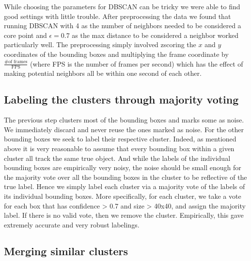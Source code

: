 \documentclass{article}
\begin{document}
While choosing the parameters for DBSCAN can be tricky we were able to find good settings with little trouble.
After preprocessing the data we found that running DBSCAN with 4 as the number of neighbors needed to be considered a core point and $\epsilon=0.7$ as
the max distance to be considered a neighbor worked particularly well. The preprocessing simply involved zscoring the $x$ and $y$ coordinates of the bounding boxes
and multiplying the frame coordinate by $\frac{\text{\# of frames}}{\text{FPS}}$ (where FPS is the number of frames per second) which has the effect of making potential neighbors all be within one
second of each other.

\subsection{Labeling the clusters through majority voting}

The previous step clusters most of the bounding boxes and marks some as noise. We immediately discard and never reuse the ones marked as noise. For the other bounding boxes we seek to label their respective
cluster. Indeed, as mentioned above it is very reasonable to assume that every bounding box within a given cluster all track the same true object. And while the labels of the individual bounding boxes
are empirically very noisy, the noise should be small enough for the majority vote over all the bounding boxes in the cluster to be reflective of the true label. Hence we simply label each cluster
via a majority vote of the labels of its individual bounding boxes. More specifically, for each cluster, we take a vote for each box that has confidence > 0.7 and size > 40x40, and assign the majority label. If there is no valid vote, then we remove the cluster.
Empirically, this gave extremely accurate and very robust labelings.

\subsection{Merging similar clusters}
\end{document}
